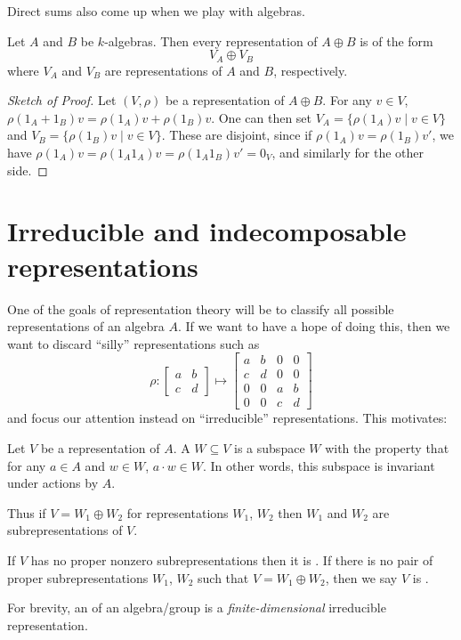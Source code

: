 Direct sums also come up when we play with algebras.
\begin{proposition}
	\label{prop:rep_direct_sum}
	Let $A$ and $B$ be $k$-algebras.
	Then every representation of $A \oplus B$ is of the form 
	\[ V_A \oplus V_B \]
	where $V_A$ and $V_B$ are representations of $A$ and $B$, respectively.
\end{proposition}
\begin{proof}[Sketch of Proof]
	Let $(V, \rho)$ be a representation of $A \oplus B$.
	For any $v \in V$, $\rho(1_A+1_B)v = \rho(1_A)v + \rho(1_B)v$.
	One can then set $V_A = \{ \rho(1_A)v \mid v \in V \}$
	and $V_B = \{ \rho(1_B)v \mid v \in V \}$.
	These are disjoint, since if $\rho(1_A) v = \rho(1_B) v'$,
	we have $\rho(1_A)v = \rho(1_A1_A)v = \rho(1_A1_B) v' = 0_V$,
	and similarly for the other side.
\end{proof}

\section{Irreducible and indecomposable representations}

One of the goals of representation theory will be to classify
all possible representations of an algebra $A$.
If we want to have a hope of doing this,
then we want to discard ``silly'' representations such as
\[
	\rho : 
	\begin{bmatrix} a & b \\ c & d \end{bmatrix} 
	\mapsto
	\begin{bmatrix} a & b & 0 & 0 \\ c & d & 0 & 0 \\
		0 & 0 & a & b \\ 0 & 0 & c & d \end{bmatrix}
\]
and focus our attention instead on ``irreducible'' representations.
This motivates:
\begin{definition}
	Let $V$ be a representation of $A$.
	A  $W \subseteq V$ is a subspace $W$
	with the property that for any $a \in A$ and $w \in W$,
	$a \cdot w \in W$.
	In other words, this subspace is invariant under actions by $A$.
\end{definition}
Thus if $V = W_1 \oplus W_2$ for representations $W_1$, $W_2$
then $W_1$ and $W_2$ are subrepresentations of $V$.

\begin{definition}
	If $V$ has no proper nonzero subrepresentations then it is .
	If there is no pair of proper subrepresentations $W_1$, $W_2$ such that $V = W_1 \oplus W_2$,
	then we say $V$ is .
\end{definition}
\begin{definition}
	For brevity, an  of an algebra/group is a
	\emph{finite-dimensional} irreducible representation.
\end{definition}

